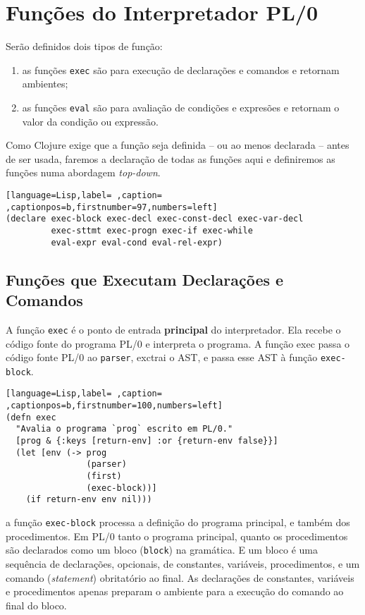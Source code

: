 \documentclass{scrartcl}
\begin{document}
\section{Funções do Interpretador PL/0}
\label{sec:org18d1268}

Serão definidos dois tipos de função:
\begin{enumerate}
\item as funções \texttt{exec} são para execução de declarações e comandos e retornam
ambientes;
\item as funções \texttt{eval} são para avaliação de condições e expresões e retornam o
valor da condição ou expressão.
\end{enumerate}

Como Clojure exige que a função seja definida -- ou ao menos declarada -- antes
de ser usada, faremos a declaração de todas as funções aqui e definiremos as
funções numa abordagem \emph{top-down}.

\begin{lstlisting}[language=Lisp,label= ,caption= ,captionpos=b,firstnumber=97,numbers=left]
(declare exec-block exec-decl exec-const-decl exec-var-decl
         exec-sttmt exec-progn exec-if exec-while
         eval-expr eval-cond eval-rel-expr)
\end{lstlisting}


\subsection{Funções que Executam Declarações e Comandos}
\label{sec:orgd607570}

A função \texttt{exec} é o ponto de entrada \textbf{principal} do interpretador. Ela recebe o
código fonte do programa PL/0 e interpreta o programa. A função exec passa o
código fonte PL/0 ao \texttt{parser}, exctrai o AST, e passa esse AST à função
\texttt{exec-block}.

\begin{lstlisting}[language=Lisp,label= ,caption= ,captionpos=b,firstnumber=100,numbers=left]
(defn exec
  "Avalia o programa `prog` escrito em PL/0."
  [prog & {:keys [return-env] :or {return-env false}}]
  (let [env (-> prog
                (parser)
                (first)
                (exec-block))]
    (if return-env env nil)))
\end{lstlisting}


a função \texttt{exec-block} processa a definição do programa principal, e também dos
procedimentos. Em PL/0 tanto o programa principal, quanto os procedimentos são
declarados como um bloco (\texttt{block}) na gramática. E um bloco é uma sequência de
declarações, opcionais, de constantes, variáveis, procedimentos, e um comando
(\emph{statement}) obritatório ao final. As declarações de constantes, variáveis e
procedimentos apenas preparam o ambiente para a execução do comando ao final do
bloco.
\end{document}
